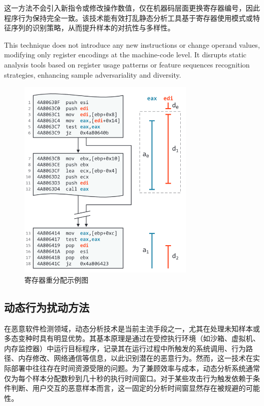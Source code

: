 这一方法不会引入新指令或修改操作数值，仅在机器码层面更换寄存器编号，因此程序行为保持完全一致。该技术能有效打乱静态分析工具基于寄存器使用模式或特征序列的识别策略，从而提升样本的对抗性与多样性。

This technique does not introduce any new instructions or change operand values, modifying only register encodings at the machine-code level. It disrupts static analysis tools based on register usage patterns or feature sequences recognition strategies, enhancing sample adversariality and diversity.

\begin{figure}[hbt]
	\centering
	\includegraphics[width=0.75\textwidth]{figures/4.6}
	\caption{寄存器重分配示例图}\label{fig:4.6}
\end{figure}

\subsection{动态行为扰动方法}

在恶意软件检测领域，动态分析技术是当前主流手段之一，尤其在处理未知样本或多态变种时具有明显优势。其基本原理是通过在受控执行环境（如沙箱、虚拟机、内存监控器）中运行目标程序，记录其在运行过程中所触发的系统调用、行为路径、内存修改、网络通信等信息，以此识别潜在的恶意行为。然而，这一技术在实际部署中往往存在时间资源受限的问题。为了兼顾效率与成本，动态分析系统通常仅为每个样本分配数秒到几十秒的执行时间窗口。对于某些攻击行为触发依赖于条件判断、用户交互的恶意样本而言，这一固定的分析时间窗显然存在被规避的可能性。

